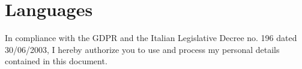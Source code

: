 \section{Languages}
\resumeHeadingListStart{}
\resumeHeadingListEnd{}

\tiny{In compliance with the GDPR and the Italian Legislative Decree no. 196 dated 30/06/2003, I hereby authorize you to use and process my personal details contained in this document.}
